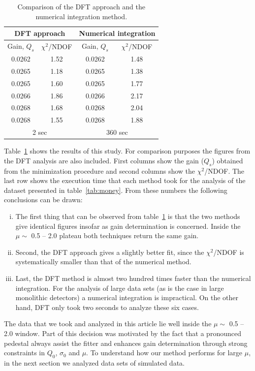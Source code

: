 \documentclass[a4paper,11pt]{article}
\begin{document}
\begin{table}[t!]
\centering
\begin{tabular}{| c  | c  | c | c | }
\hline  \multicolumn{2}{|c|}{ DFT approach} & \multicolumn{2}{|c|}{Numerical integration} \\[0.6ex] \hline\hline
  Gain, $Q_s$ & $\chi^2$/NDOF & Gain, $Q_s$  & $\chi^2$/NDOF \\ \hline
 0.0262 & 1.52 & 0.0262 & 1.48 \\
 0.0265 & 1.18 & 0.0265 & 1.38 \\ 
 0.0265 & 1.60 & 0.0265 & 1.77 \\ 
 0.0266 & 1.86 & 0.0266 & 2.17 \\ 
 0.0268 & 1.68 & 0.0268 & 2.04 \\
 0.0268 & 1.55 & 0.0268 & 1.88
\\[0.6ex] \hline\hline 
\multicolumn{2}{|c|}{ 2 sec } & \multicolumn{2}{|c|}{ 360 sec } \\  \hline
\end{tabular}
\caption{Comparison of the DFT approach and the numerical integration method.} 
\label{tab:comp}
\end{table}

Table~\ref{tab:comp} shows the results of this study.
For comparison purposes the figures from the DFT analysis are also included. 
First columns show the gain ($Q_s$) obtained from the minimization procedure and second columns show the $\chi^2$/NDOF. 
The last row shows the execution time that each method took for the analysis of the dataset presented in table~\ref{tab:money}.
From these numbers the following conclusions can be drawn:
\begin{enumerate}[i.]
\item The first thing that can be observed from table~\ref{tab:comp} is that the two methods give identical figures insofar as gain determination is concerned. 
Inside the $\mu\sim$ 0.5 -- 2.0 plateau both techniques return the same gain. 
\item Second, the DFT approach gives a slightly better fit, since the $\chi^2$/NDOF is systematically smaller than that of the numerical method. 
\item Last, the DFT method is almost two hundred times faster than the numerical integration. 
For the analysis of large data sets (as is the case in large monolithic detectors) a numerical integration is impractical. 
On the other hand, DFT only took two seconds to analyze these six cases. 
\end{enumerate}
The data that we took and analyzed in this article lie well inside the $\mu\sim$ 0.5 -- 2.0 window. 
Part of this decision was motivated by the fact that a pronounced pedestal always assist the fitter and enhances gain determination through strong constraints in $Q_0$, $\sigma_0$ and $\mu$. 
To understand how our method performs for large $\mu$, in the next section we analyzed data sets of simulated data.  
\end{document}

